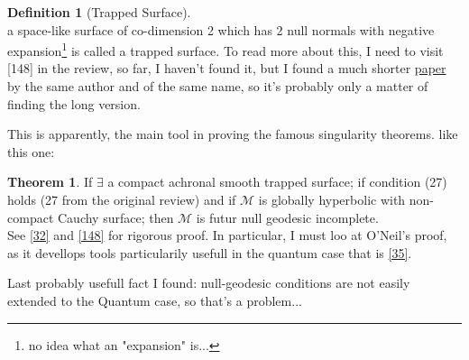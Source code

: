 \documentclass[a4paper,11pt]{article}
\numberwithin{equation}{section}
\theoremstyle{definition}
\newtheorem{definition}{Definition}
\newtheorem{theorem}{Theorem}
\begin{document}
\begin{definition}[Trapped Surface] $\quad$\\
 a space-like surface of co-dimension 2 which has 2 null normals with negative expansion\footnote{\color{red}no idea what an "expansion" is...\color{black}} is called a trapped surface. \color{red}To read more about this, I need to visit [148] in the review, so far, I haven't found it, but I found a much shorter \hyperlink{https://arxiv.org/pdf/1107.1344}{paper} by the same author and of the same name, so it's probably only a matter of finding the long version.\color{black}
\end{definition}
This is apparently, the main tool in proving the famous singularity theorems. like this one:
\begin{theorem}
    If $\exists$ a compact achronal smooth trapped surface; if condition (27) holds (27 from the original review) and if $\mathcal{M}$ is globally hyperbolic with non-compact Cauchy surface; then $\mathcal{M}$ is futur null geodesic incomplete.\\\color{red}See \href{https://www.cambridge.org/core/books/large-scale-structure-of-spacetime/1E6B961EC9878EDDBBD6AC0AF031CC93}{[32]} and \href{https://arxiv.org/pdf/1410.5226}{[148]} for rigorous proof. In particular, I must loo at O'Neil's proof, as it devellops tools particularily usefull in the quantum case that is \href{https://ia902501.us.archive.org/27/items/mathematics_202103/%28Pure%20and%20Applied%20Mathematics%2C%20Volume%20103%29%20Barrett%20O%27Neill-Semi-Riemannian%20Geometry%20With%20Applications%20to%20Relativity-Academic%20Press%20%281983%29.pdf}{[35]}\color{black}.
\end{theorem}
Last probably usefull fact I found: null-geodesic conditions are not easily extended to the Quantum case, so that's a problem...
\end{document}
